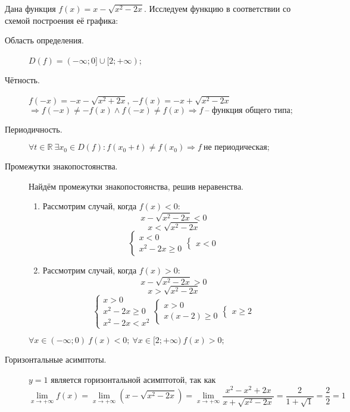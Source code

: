 \documentclass{article}
\begin{document}
\clearpage
Дана функция $f(x) = x - \sqrt{x^2 - 2x}$. Исследуем функцию в соответствии со схемой построения её графика:
\begin{description}
\item[Область определения.] $D(f) = (-\infty;0]\cup[2;+\infty)$;
\item[Чётность.] $f(-x) = -x - \sqrt{x^2+2x}$, $-f(x) = -x + \sqrt{x^2 - 2x}$ $\Rightarrow f(-x) \not= -f(x) \land f(-x) \not= f(x) \Rightarrow f~\textrm{-- функция общего типа;}$
\item[Периодичность.] $\forall t \in \mathbb{R}~\exists x_0 \in D(f): f(x_0+t)\ne f(x_0)\Rightarrow f~\textrm{не периодическая;}$
\item[Промежутки знакопостоянства.] Найдём промежутки знакопостоянства, решив неравенства.
\begin{enumerate}
\item Рассмотрим случай, когда $f(x) < 0$:
\begin{equation*}
    x - \sqrt{x^2-2x} < 0
\end{equation*}
\begin{equation*}
    x < \sqrt{x^2-2x}
\end{equation*}
\begin{equation*} \begin{cases*} x < 0 \\ x^2 - 2x \geq 0 \end{cases*}\begin{cases*} x < 0 \end{cases*} \end{equation*}
\item Рассмотрим случай, когда $f(x) > 0$:
\begin{equation*}
    x - \sqrt{x^2-2x} > 0
\end{equation*}
\begin{equation*}
    x > \sqrt{x^2-2x}
\end{equation*}
\begin{equation*} \begin{cases*} x > 0 \\ x^2 - 2x \geq 0 \\ x^2 - 2x < x^2 \end{cases*}\begin{cases*} x > 0 \\ x(x-2) \geq 0 \end{cases*} \begin{cases*} x \geq 2 \end{cases*} \end{equation*}
\end{enumerate}
$\forall x \in (-\infty; 0)~f(x) < 0;~\forall x \in [2; +\infty)~f(x) > 0;$
\item[Горизонтальные асимптоты.]
    $y = 1$ является горизонтальной асимптотой, так как
    \begin{equation*}
        \lim\limits_{x \to +\infty}{f(x)} = \lim\limits_{x \to +\infty}(x - \sqrt{x^2-2x}) = \lim\limits_{x \to +\infty}\dfrac{x^2-x^2+2x}{x+\sqrt{x^2-2x}} = \dfrac{2}{1+\sqrt{1}} = \dfrac 2 2 = 1
    \end{equation*}


\end{description}
\end{document}
